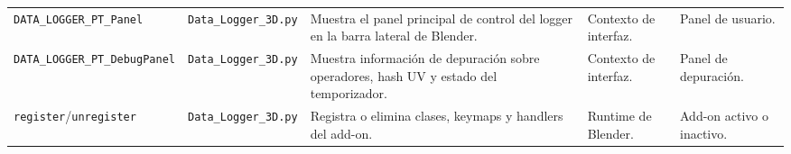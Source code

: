 {\begin{landscape}
\begin{longtable}{p{4.7cm}p{3.2cm}p{8.5cm}p{3.8cm}p{3.8cm}}
\texttt{DATA\_LOGGER\_PT\_Panel} & \texttt{Data\_Logger\_3D.py} & Muestra el panel principal de control del logger en la barra lateral de Blender. & Contexto de interfaz. & Panel de usuario. \\
\texttt{DATA\_LOGGER\_PT\_DebugPanel} & \texttt{Data\_Logger\_3D.py} & Muestra información de depuración sobre operadores, hash UV y estado del temporizador. & Contexto de interfaz. & Panel de depuración. \\
\texttt{register}/\texttt{unregister} & \texttt{Data\_Logger\_3D.py} & Registra o elimina clases, keymaps y handlers del add-on. & Runtime de Blender. & Add-on activo o inactivo. \\
\end{longtable}
\endgroup
\end{landscape}
}

